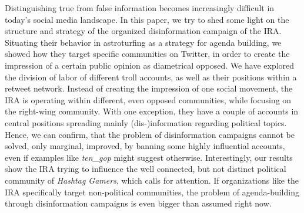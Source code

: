 \documentclass[12pt, titlepage=true, toc=bib]{scrartcl}
\begin{document}
Distinguishing true from false information becomes increasingly difficult in today's social media landscape. In this paper, we try to shed some light on the structure and strategy of the organized disinformation campaign of the IRA. Situating their behavior in astroturfing as a strategy for agenda building, we showed how they target specific communities on Twitter, in order to create the impression of a certain public opinion as diametrical opposed. We have explored the division of labor of different troll accounts, as well as their positions within a retweet network. Instead of creating the impression of one social movement, the IRA is operating within different, even opposed communities, while focusing on the right-wing community. With one exception, they have a couple of accounts in central positions spreading mainly (dis-)information regarding political topics. Hence, we can confirm, that the problem of disinformation campaigns cannot be solved, only marginal, improved, by banning some highly influential accounts, even if examples like \textit{ten\_gop} might suggest otherwise. Interestingly, our results show the IRA trying to influence the well connected, but not distinct political community of \textit{Hashtag Gamers}, which calls for attention. If organizations like the IRA specifically target non-political communities, the problem of agenda-building through disinformation campaigns is even bigger than assumed right now.
\end{document}
